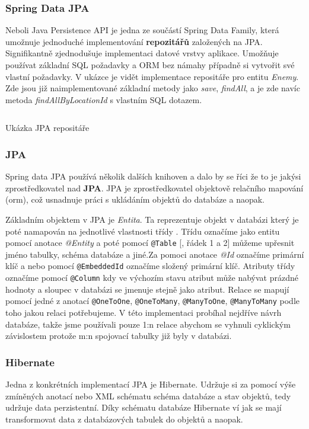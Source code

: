 \subsubsection*{Spring Data JPA}
Neboli Java Persistence API je jedna ze součástí Spring Data Family, která umožnuje jednoduché implementování \textbf{repozitářů} založených na JPA. Signifikantně zjednodušuje implementaci datové vrstvy aplikace. Umožňuje používat základní SQL požadavky a ORM bez námahy případně si vytvořit své vlastní požadavky. V ukázce  je vidět implementace repositáře pro entitu \textit{Enemy}. Zde jsou již naimplementované základní metody jako \textit{save}, \textit{findAll}, a je zde navíc metoda \textit{findAllByLocationId} s vlastním SQL dotazem.

\begin{listing}[ht!]
    \inputminted[]{Java}{resources/code/impl/EnemyRepo.java}
    \caption{Ukázka JPA repositáře}
    \label{code:JPA_repo}
\end{listing}

\subsubsection*{JPA}
Spring data JPA používá několik dalších knihoven a dalo by se říci že to je jakýsi zprostředkovatel nad \textbf{JPA}. JPA je zprostředkovatel objektově relačního mapování (\gls{orm}), což usnadnuje práci s ukládáním objektů do databáze a naopak.

Základním objektem v JPA je \textit{Entita}. Ta reprezentuje objekt v databázi který je poté namapován na jednotlivé vlastnosti třídy .
Třídu označíme jako entitu pomocí anotace \textit{@Entity} a poté pomocí \texttt{@Table} [, řádek 1 a 2] můžeme upřesnit jméno tabulky, schéma databáze a jiné.Za pomoci anotace \textit{@Id} označíme primární klíč a nebo pomocí \texttt{@EmbeddedId} označíme složený primární klíč. Atributy třídy označíme pomocí \texttt{@Column} kdy ve výchozím stavu atribut může nabývat prázdné hodnoty a sloupec v databázi se jmenuje stejně jako atribut. Relace se mapují pomocí jedné z anotací \texttt{@OneToOne}, \texttt{@OneToMany}, \texttt{@ManyToOne}, \texttt{@ManyToMany} podle toho jakou relaci potřebujeme. V této implementaci probíhal nejdříve návrh databáze, takže jsme používali pouze 1:n relace abychom se vyhnuli cyklickým závislostem protože m:n spojovací tabulky již byly v databázi.

\subsubsection*{Hibernate}
Jedna z konkrétních implementací JPA je Hibernate. Udržuje si za pomocí výše zmíněných anotací nebo XML  schématu schéma databáze a stav objektů, tedy udržuje data perzistentní. Díky schématu databáze Hibernate ví jak se mají transformovat data z databázových tabulek do objektů a naopak. \cite[]{enwiki:1217225259}

